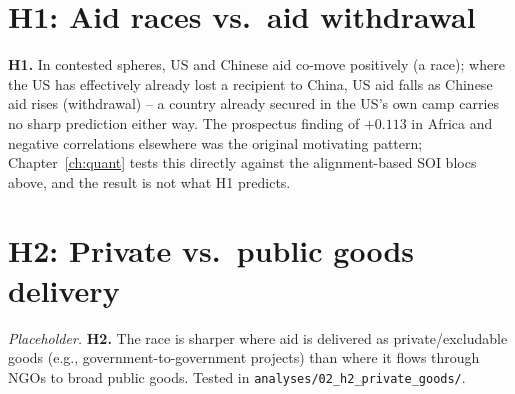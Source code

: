 \section{H1: Aid races vs.\ aid withdrawal}
\textbf{H1.} In contested spheres, US and Chinese aid co-move positively (a
race); where the US has effectively already lost a recipient to China, US aid
falls as Chinese aid rises (withdrawal) -- a country already secured in the
US's own camp carries no sharp prediction either way. The prospectus finding
of $+0.113$ in Africa and negative correlations elsewhere was the original
motivating pattern; Chapter~\ref{ch:quant} tests this directly against the
alignment-based SOI blocs above, and the result is not what H1 predicts.

\section{H2: Private vs.\ public goods delivery}
\textit{Placeholder.} \textbf{H2.} The race is sharper where aid is delivered
as private/excludable goods (e.g., government-to-government projects) than where
it flows through NGOs to broad public goods. Tested in
\texttt{analyses/02\_h2\_private\_goods/}.

